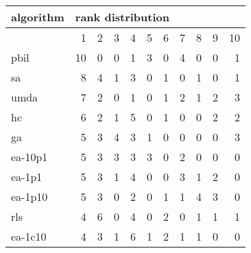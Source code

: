\begin{tabular}{@{}l*{10}{r}@{}}
\toprule
algorithm & \multicolumn{10}{l}{{rank distribution}}\\
\midrule
& 1 & 2 & 3 & 4 & 5 & 6 & 7 & 8 & 9 & 10\\
\midrule
pbil & 10 & 0 & 0 & 1 & 3 & 0 & 4 & 0 & 0 & 1\\
sa & 8 & 4 & 1 & 3 & 0 & 1 & 0 & 1 & 0 & 1\\
umda & 7 & 2 & 0 & 1 & 0 & 1 & 2 & 1 & 2 & 3\\
hc & 6 & 2 & 1 & 5 & 0 & 1 & 0 & 0 & 2 & 2\\
ga & 5 & 3 & 4 & 3 & 1 & 0 & 0 & 0 & 0 & 3\\
ea-10p1 & 5 & 3 & 3 & 3 & 3 & 0 & 2 & 0 & 0 & 0\\
ea-1p1 & 5 & 3 & 1 & 4 & 0 & 0 & 3 & 1 & 2 & 0\\
ea-1p10 & 5 & 3 & 0 & 2 & 0 & 1 & 1 & 4 & 3 & 0\\
rls & 4 & 6 & 0 & 4 & 0 & 2 & 0 & 1 & 1 & 1\\
ea-1c10 & 4 & 3 & 1 & 6 & 1 & 2 & 1 & 1 & 0 & 0\\
\bottomrule
\end{tabular}
